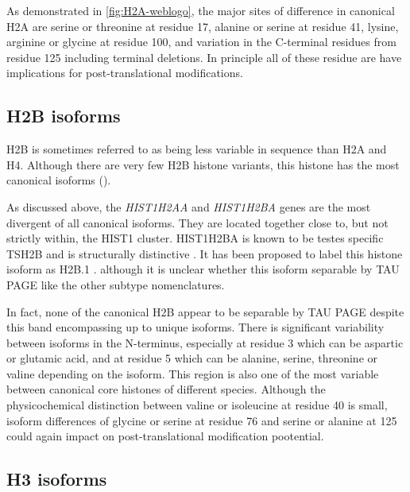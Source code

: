 	As demonstrated in \ref{fig:H2A-weblogo}, the major sites of difference in canonical H2A are 
	serine or threonine at residue 17, 
	alanine or serine at residue 41, 
	lysine, arginine or glycine at residue 100, 
	and variation in the C-terminal residues from residue 125 including terminal deletions. 
	In principle all of these residue are have implications for post-translational modifications.
	
  \subsection{H2B isoforms}

	H2B is sometimes referred to as being less variable in sequence than H2A and H4. 
	Although there are very few H2B histone variants, this histone has the most canonical isoforms ().

	As discussed above, the \textit{HIST1H2AA} and \textit{HIST1H2BA} genes 
	are the most divergent of all canonical isoforms.
	They are located together close to, but not strictly within, the HIST1 cluster. 
	HIST1H2BA is known to be testes specific TSH2B and is structurally distinctive . 
	It has been proposed to label this histone isoform as H2B.1 . 
	although it is unclear whether this isoform separable by TAU PAGE like the other subtype nomenclatures.

	In fact, none of the canonical H2B appear to be separable by TAU PAGE 
	despite this band encompassing up to \HTwoBUniqueProteins{} unique isoforms. 
	There is significant variability between isoforms in the N-terminus, 
	especially at residue 3 which can be aspartic or glutamic acid, 
	and at residue 5 which can be alanine, serine, threonine or valine depending on the isoform. 
	This region is also one of the most variable between canonical core histones of different species. 
	Although the physicochemical distinction between valine or isoleucine at residue 40 is small, 
	isoform differences of glycine or serine at residue 76 
	and serine or alanine at 125 could again impact on post-translational modification pootential.
	
  \subsection{H3 isoforms}
	
